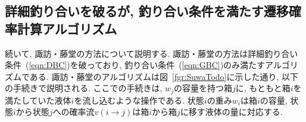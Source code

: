 \subsection{詳細釣り合いを破るが, 釣り合い条件を満たす遷移確率計算アルゴリズム}

続いて, 諏訪・藤堂の方法について説明する.
諏訪・藤堂の方法は詳細釣り合い条件~(\ref{eqn:DBC})を破っており, 釣り合い条件~(\ref{eqn:GBC})のみ満たすアルゴリズムである.
諏訪・藤堂のアルゴリズムは図~\ref{fgr:SuwaTodo}に示した通り, 以下の手続きで説明される.
ここでの手続きは, $w_{j}$の容量を持つ箱$j$に, もともと箱$i$を満たしていた液体$i$を流し込むような操作である.
状態$i$の重み$w_{i}$は箱$i$の容量, 状態$i$から状態$j$への確率流$v(i \to j)$は箱$i$から箱$j$に移す液体の量に対応する.



